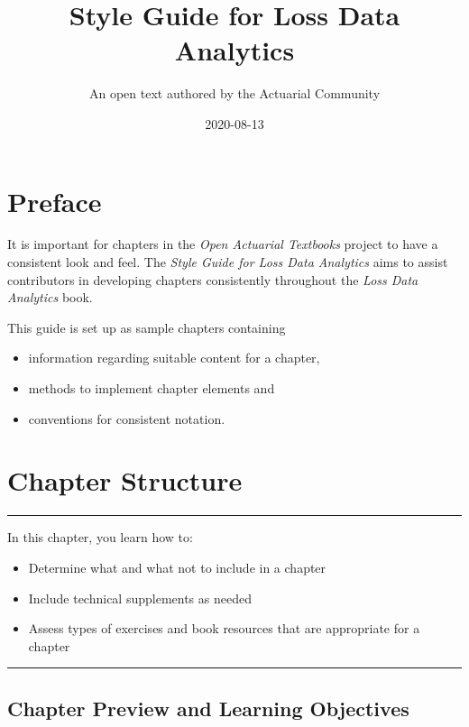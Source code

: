 \documentclass[
]{book}
\title{Style Guide for Loss Data Analytics}
\author{An open text authored by the Actuarial Community}
\date{2020-08-13}
\providecommand{\tightlist}{%
  \setlength{\itemsep}{0pt}\setlength{\parskip}{0pt}}
\begin{document}
\maketitle

{
\setcounter{tocdepth}{1}
\tableofcontents
}
\hypertarget{preface}{%
\chapter*{Preface}\label{preface}}

It is important for chapters in the \emph{Open Actuarial Textbooks} project to have a consistent look and feel. The \emph{Style Guide for Loss Data Analytics} aims to assist contributors in developing chapters consistently throughout the \emph{Loss Data Analytics} book.

This guide is set up as sample chapters containing

\begin{itemize}
\tightlist
\item
  information regarding suitable content for a chapter,
\item
  methods to implement chapter elements and
\item
  conventions for consistent notation.
\end{itemize}

\hypertarget{chapter-structure}{%
\chapter{Chapter Structure}\label{chapter-structure}}

\begin{center}\rule{0.5\linewidth}{0.5pt}\end{center}

In this chapter, you learn how to:

\begin{itemize}
\tightlist
\item
  Determine what and what not to include in a chapter
\item
  Include technical supplements as needed
\item
  Assess types of exercises and book resources that are appropriate for a chapter
\end{itemize}

\begin{center}\rule{0.5\linewidth}{0.5pt}\end{center}

\hypertarget{chapter-preview-and-learning-objectives}{%
\section{Chapter Preview and Learning Objectives}\label{chapter-preview-and-learning-objectives}}
\end{document}
